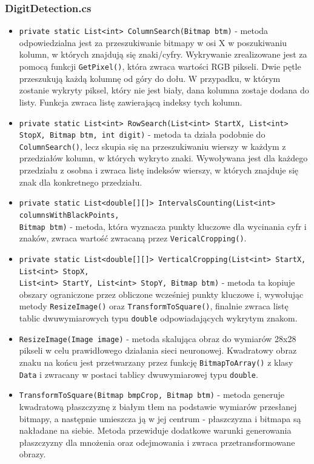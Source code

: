 \documentclass[12pt,a4paper]{article}
\begin{document}
\subsubsection*{DigitDetection.cs}
	\begin{itemize}
	    \item \lstinline{private static List<int> ColumnSearch(Bitmap btm)} - metoda odpowiedzialna jest za przeszukiwanie bitmapy w osi X w poszukiwaniu kolumn, w których znajdują się znaki/cyfry. Wykrywanie zrealizowane jest za pomocą funkcji \lstinline{GetPixel()}, która zwraca wartości RGB pikseli. Dwie pętle przeszukują każdą kolumnę od góry do dołu. W przypadku, w którym zostanie wykryty piksel, który nie jest biały, dana kolumna zostaje dodana do listy. Funkcja zwraca listę zawierającą indeksy tych kolumn.
	    \item \lstinline{private static List<int> RowSearch(List<int> StartX, List<int> StopX, Bitmap btm, int digit)} - metoda ta działa podobnie do \lstinline{ColumnSearch()}, lecz skupia się na przeszukiwaniu wierszy w każdym z przedziałów kolumn, w których wykryto znaki. Wywoływana jest dla każdego przedziału z osobna i zwraca listę indeksów wierszy, w których znajduje się znak dla konkretnego przedziału.
	    \item \lstinline{private static List<double[][]> IntervalsCounting(List<int> columnsWithBlackPoints,} \\ \lstinline{Bitmap btm)} - metoda, która wyznacza punkty kluczowe dla wycinania cyfr i znaków, zwraca wartość zwracaną przez \lstinline{VericalCropping()}.
	    \item \lstinline{private static List<double[][]> VerticalCropping(List<int> StartX, List<int> StopX,} \\ \lstinline{List<int> StartY, List<int> StopY, Bitmap btm)} - metoda ta kopiuje obszary ograniczone przez obliczone wcześniej punkty kluczowe i, wywołując metody \lstinline{ResizeImage()} oraz \lstinline{TransformToSquare()}, finalnie zwraca listę tablic dwuwymiarowych typu \lstinline{double} odpowiadających wykrytym znakom.
	    \item \lstinline{ResizeImage(Image image)} - metoda skalująca obraz do wymiarów 28x28 pikseli w celu prawidłowego działania sieci neuronowej. Kwadratowy obraz znaku na końcu jest przetwarzany przez funkcję \lstinline{BitmapToArray()} z klasy \lstinline{Data} i zwracany w postaci tablicy dwuwymiarowej typu \lstinline{double}.
	    \item \lstinline{TransformToSquare(Bitmap bmpCrop, Bitmap btm)} - metoda generuje kwadratową płaszczyznę z białym tłem na podstawie wymiarów przesłanej bitmapy, a następnie umieszcza ją w jej centrum - płaszczyzna i bitmapa są nakładane na siebie. Metoda przewiduje dodatkowe warunki generowania płaszczyzny dla mnożenia oraz odejmowania i zwraca przetransformowane obrazy.

\end{itemize}
\end{document}
